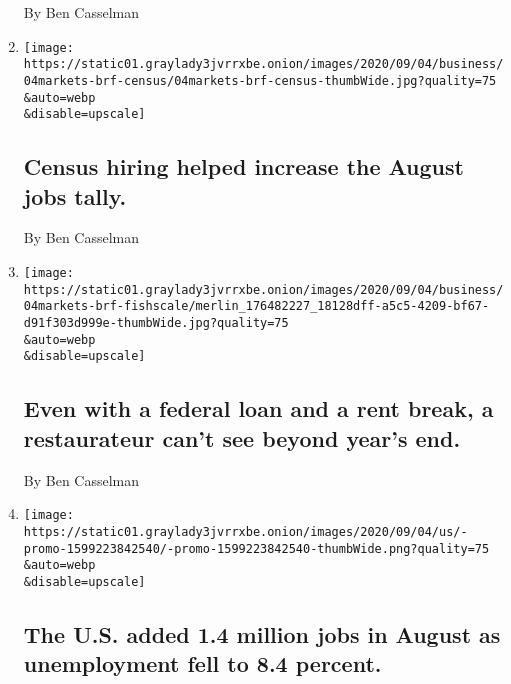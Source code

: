 \begin{enumerate}
  By Ben Casselman
\item
  \href{/2020/09/04/business/census-hiring-helped-increase-the-august-jobs-tally.html}{}

  \texttt{[image: https://static01.graylady3jvrrxbe.onion/images/2020/09/04/business/04markets-brf-census/04markets-brf-census-thumbWide.jpg?quality=75\\\&auto=webp\\\&disable=upscale]}

  \hypertarget{census-hiring-helped-increase-the-august-jobs-tally}{%
  \subsection{Census hiring helped increase the August jobs
  tally.}\label{census-hiring-helped-increase-the-august-jobs-tally}}

  By Ben Casselman
\item
  \href{/2020/09/04/business/even-with-a-federal-loan-and-a-rent-break-a-restaurateur-cant-see-beyond-years-end.html}{}

  \texttt{[image: https://static01.graylady3jvrrxbe.onion/images/2020/09/04/business/04markets-brf-fishscale/merlin\_176482227\_18128dff-a5c5-4209-bf67-d91f303d999e-thumbWide.jpg?quality=75\\\&auto=webp\\\&disable=upscale]}

  \hypertarget{even-with-a-federal-loan-and-a-rent-break-a-restaurateur-cant-see-beyond-years-end}{%
  \subsection{Even with a federal loan and a rent break, a restaurateur
  can't see beyond year's
  end.}\label{even-with-a-federal-loan-and-a-rent-break-a-restaurateur-cant-see-beyond-years-end}}

  By Ben Casselman
\item
  \href{/live/2020/09/04/business/stock-market-today-coronavirus/jobs-report-august-2020}{}

  \texttt{[image: https://static01.graylady3jvrrxbe.onion/images/2020/09/04/us/-promo-1599223842540/-promo-1599223842540-thumbWide.png?quality=75\\\&auto=webp\\\&disable=upscale]}

  \hypertarget{the-us-added-14-million-jobs-in-august-as-unemployment-fell-to-84-percent}{%
  \subsection{The U.S. added 1.4 million jobs in August as unemployment
  fell to 8.4
  percent.}\label{the-us-added-14-million-jobs-in-august-as-unemployment-fell-to-84-percent}}


\end{enumerate}
